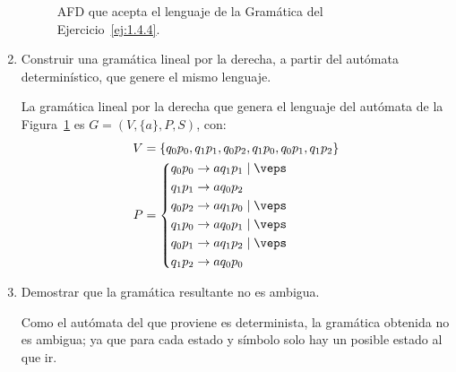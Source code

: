 \begin{ejercicio}
\begin{enumerate}
\begin{figure}
            \caption{AFD que acepta el lenguaje de la Gramática del Ejercicio~\ref{ej:1.4.4}.}
            \label{fig:1.4.4.AFD3}
        \end{figure}
        \item Construir una gramática lineal por la derecha, a partir del autómata determinístico, que genere el mismo lenguaje.
        
        La gramática lineal por la derecha que genera el lenguaje del autómata de la Figura~\ref{fig:1.4.4.AFD3} es
        $G=(V,\{a\},P,S)$, con:
        \begin{equation*}
            \begin{aligned}
                V &= \{ q_0p_0, q_1p_1, q_0p_2, q_1p_0, q_0p_1, q_1p_2 \} \\
                P &= \left\{
                    \begin{aligned}
                        q_0p_0 &\rightarrow aq_1p_1 \mid \veps \\
                        q_1p_1 &\rightarrow aq_0p_2 \\
                        q_0p_2 &\rightarrow aq_1p_0 \mid \veps \\
                        q_1p_0 &\rightarrow aq_0p_1 \mid \veps \\
                        q_0p_1 &\rightarrow aq_1p_2 \mid \veps \\
                        q_1p_2 &\rightarrow aq_0p_0
                    \end{aligned}
                \right.
            \end{aligned}
        \end{equation*}
        \item Demostrar que la gramática resultante no es ambigua.
        
        Como el autómata del que proviene es determinista, la gramática obtenida no es ambigua; ya que para cada estado y símbolo solo hay un posible estado al que ir.
    \end{enumerate}
\end{ejercicio}

